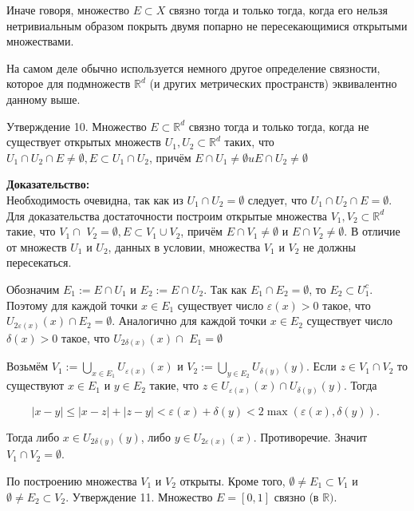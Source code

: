 \documentclass[a4paper,12pt]{article} %
\begin{document}
	Иначе говоря, множество $E \subset X$ связно тогда и только тогда, когда его нельзя нетривиальным образом покрыть двумя попарно не пересекающимися открытыми множествами.
	
	На самом деле обычно используется немного другое определение связности, которое для подмножеств $\mathbb{R}^{d}$ (и других метрических пространств) эквивалентно данному выше.
	
	Утверждение 10. Множество $E \subset \mathbb{R}^{d}$ связно тогда и только тогда, когда не существует открытых множеств $U_{1}, U_{2} \subset \mathbb{R}^{d}$ таких, что $U_{1} \cap U_{2} \cap E \neq \emptyset, E \subset U_{1} \cap U_{2}$, причём $E \cap U_{1} \neq \emptyset u E \cap U_{2} \neq \emptyset$
	
	\textbf{Доказательство:\\}
	Необходимость очевидна, так как из $U_{1} \cap U_{2}=\emptyset$ следует, что $U_{1} \cap U_{2} \cap E=\emptyset$. Для доказательства достаточности построим открытые множества $V_{1}, V_{2} \subset \mathbb{R}^{d}$ такие, что $V_{1} \cap$ $V_{2}=\emptyset, E \subset V_{1} \cup V_{2}$, причём $E \cap V_{1} \neq \emptyset$ и $E \cap V_{2} \neq \emptyset$. В отличие от множеств $U_{1}$ и $U_{2}$, данных в условии, множества $V_{1}$ и $V_{2}$ не должны пересекаться.
	
	Обозначим $E_{1}:=E \cap U_{1}$ и $E_{2}:=E \cap U_{2}$. Так как $E_{1} \cap E_{2}=\emptyset$, то $E_{2} \subset U_{1}^{c}$. Поэтому для каждой точки $x \in E_{1}$ существует число $\varepsilon(x)>0$ такое, что $U_{2 \varepsilon(x)}(x) \cap E_{2}=\emptyset$. Аналогично для каждой точки $x \in E_{2}$ существует число $\delta(x)>0$ такое, что $U_{2 \delta(x)}(x) \cap$ $E_{1}=\emptyset$
	
	Возьмём $V_{1}:=\bigcup_{x \in E_{1}} U_{\varepsilon(x)}(x)$ и $V_{2}:=\bigcup_{y \in E_{2}} U_{\delta(y)}(y)$. Если $z \in V_{1} \cap V_{2}$ то существуют $x \in E_{1}$ и $y \in E_{2}$ такие, что $z \in U_{\varepsilon(x)}(x) \cap U_{\delta(y)}(y)$. Тогда
	
	$$
	|x-y| \leq|x-z|+|z-y|<\varepsilon(x)+\delta(y)<2 \max (\varepsilon(x), \delta(y)) \text {. }
	$$
	
	Тогда либо $x \in U_{2 \delta(y)}(y)$, либо $y \in U_{2 \varepsilon(x)}(x)$. Противоречие. Значит $V_{1} \cap V_{2}=\emptyset$.
	
	По построению множества $V_{1}$ и $V_{2}$ открыты. Кроме того, $\emptyset \neq E_{1} \subset V_{1}$ и $\emptyset \neq E_{2} \subset V_{2}$. Утверждение 11. Множество $E=[0,1]$ связно (в $\mathbb{R})$.
	
\end{document}
